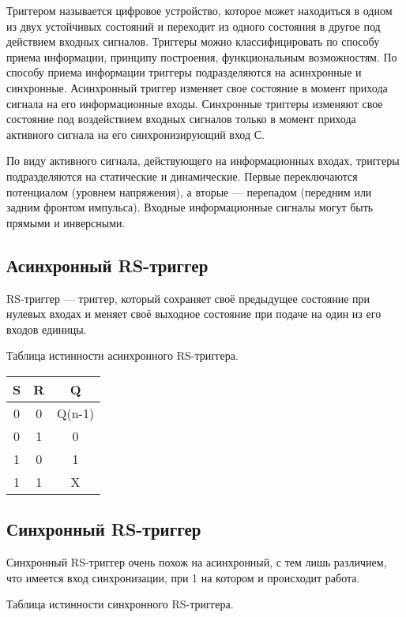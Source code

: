 Триггером называется цифровое устройство, которое может находиться в одном из двух устойчивых состояний и переходит из одного состояния в другое под действием входных сигналов. Триггеры можно классифицировать по способу приема информации, принципу построения, функциональным возможностям. По способу приема информации триггеры подразделяются на асинхронные и синхронные. Асинхронный триггер изменяет свое состояние в момент прихода сигнала на его информационные входы. Синхронные триггеры изменяют свое состояние под воздействием входных сигналов только в момент прихода активного сигнала на его синхронизирующий вход С.

По виду активного сигнала, действующего на информационных входах, триггеры подразделяются на статические и динамические. Первые переключаются потенциалом (уровнем напряжения), а вторые --- перепадом (передним или задним фронтом импульса). Входные информационные сигналы могут быть прямыми и инверсными.

\subsection*{Асинхронный RS-триггер}

RS-триггер --- триггер, который сохраняет своё предыдущее состояние при нулевых входах и меняет своё выходное состояние при подаче на один из его входов единицы.

Таблица истинности асинхронного RS-триггера.

\begin{tabular}{|c|c|c|}
\hline	S	& R	& Q			\\
\hline	0	& 0	& Q(n-1)	\\
\hline	0	& 1	& 0			\\
\hline	1	& 0	& 1			\\
\hline	1	& 1	& X			\\
\hline
\end{tabular}

\subsection*{Синхронный RS-триггер}

Синхронный RS-триггер очень похож на асинхронный, с тем лишь различием, что имеется вход синхронизации, при 1 на котором и происходит работа.

Таблица истинности синхронного RS-триггера.

